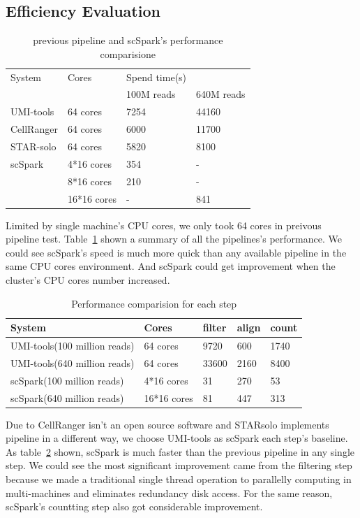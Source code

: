 \documentclass[10pt,journal,compsoc]{IEEEtran}
\begin{document}
\subsection{Efficiency Evaluation}
\begin{table}
	\centering
	\caption{previous pipeline and scSpark's performance comparisione}\label{tab1}
	\resizebox{0.45\textwidth}{!} {
	\begin{tabular}{l | l | l  l}
		\hline
		System &  Cores & Spend time(s) \\
		&  & 100M reads & 640M reads  \\
		\hline
		UMI-tools & 64 cores & 7254 & 44160 \\
		CellRanger & 64 cores & 6000 & 11700 \\
		STAR-solo & 64 cores &  5820 & 8100 \\
		scSpark & 4*16 cores & 354 & - \\
		& 8*16 cores & 210 & - \\
		& 16*16 cores & - & 841 \\
		\hline
	\end{tabular}
	}
\end{table}
Limited by single machine's CPU cores, we only took 64 cores in preivous pipeline test.
Table~\ref{tab1} shown a summary of all the pipelines's performance.
We could see scSpark's speed is much more quick than any available pipeline in the same CPU cores environment.
And scSpark could get improvement when the cluster's CPU cores number increased.
\begin{table}
	\centering
	\caption{Performance comparision for each step}\label{tab2}
	\resizebox{0.45\textwidth}{!} {
	\begin{tabular}{l | l | l | l | l}
		\hline
		System & Cores & filter & align & count \\
		\hline
		UMI-tools(100 million reads) & 64 cores & 9720 & 600 & 1740 \\
		UMI-tools(640 million reads) & 64 cores & 33600 & 2160 & 8400 \\
		scSpark(100 million reads) & 4*16 cores & 31 & 270 & 53 \\
		scSpark(640 million reads) & 16*16 cores & 81 & 447 & 313 \\
		\hline
	\end{tabular} }
\end{table}
Due to CellRanger isn't an open source software and STARsolo implements pipeline in a different way, we choose UMI-tools as scSpark each step's baseline.
As table~\ref{tab2} shown, scSpark is much faster than the previous pipeline in any single step.
We could see the most significant improvement came from the filtering step because we made a traditional single thread operation to parallelly computing in multi-machines and eliminates redundancy disk access.
For the same reason, scSpark's countting step also got considerable improvement.
\end{document}
